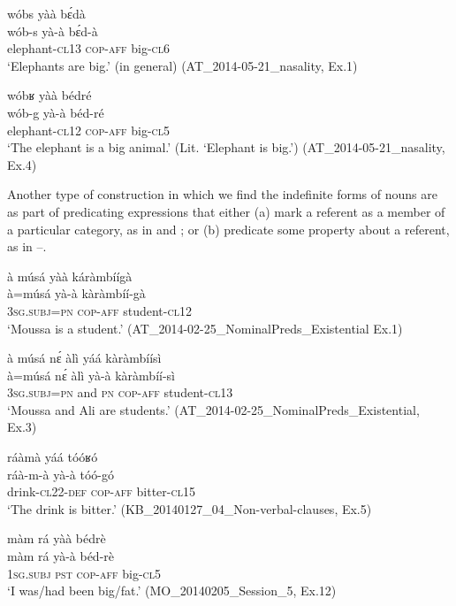 \documentclass[output=paper]{langsci/langscibook}
\begin{document}
\ea\label{ex:teo:32}
\glll wóbs yàà b\'ɛdà\\
 wób-s yà-à b\'ɛd-à\\
 elephant-\textsc{cl13} \textsc{cop-aff} big-\textsc{cl6}\\
\glt ‘Elephants are big.’ (in general) (AT\_2014-05-21\_nasality, Ex.1)
\z

\ea\label{ex:teo:33}
\glll wóbʁ yàà bédré\\
 wób-g yà-à béd-ré\\
elephant-\textsc{cl12} \textsc{cop-aff} big-\textsc{cl5}\\
\glt ‘The elephant is a big animal.’ (Lit. ‘Elephant is big.’) (AT\_2014-05-21\_nasality, Ex.4)
\z

Another type of construction in which we find the indefinite forms of nouns are as part of predicating expressions that either (a) mark a referent as a member of a particular category, as in  and ; or (b) predicate some property about a referent, as in –.

\ea\label{ex:teo:34}
\glll à músá yàà káràmbíígà\\
  à=músá yà-à kàràmbíí-gà\\
 \textsc{3sg.subj=pn} \textsc{cop-aff} student-\textsc{cl12}\\
\glt ‘Moussa is a student.’ (AT\_2014-02-25\_NominalPreds\_Existential Ex.1)
\z

\ea\label{ex:teo:35}
\glll à músá n\'ɛ àlì yáá kàràmbíísì\\
 à=músá n\'ɛ àlì yà-à kàràmbíí-sì\\
\textsc{3sg.subj=pn} and \textsc{pn}  \textsc{cop-aff} student-\textsc{cl}13\\
\glt ‘Moussa and Ali are students.’ (AT\_2014-02-25\_NominalPreds\_Existential, Ex.3)
\z

\ea\label{ex:teo:36}
\glll ráàmà yáá tóóʁó\\
 ráà-m-à yà-à tóó-gó\\
drink-\textsc{cl22-def} \textsc{cop-aff} bitter-\textsc{cl15}\\
\glt ‘The drink is bitter.’ (KB\_20140127\_04\_Non-verbal-clauses, Ex.5)
\z

\ea\label{ex:teo:37}
\glll màm rá yàà bédrè\\
 màm rá yà-à béd-rè\\
\textsc{1sg.subj} \textsc{pst} \textsc{cop-aff} big-\textsc{cl5}\\
\glt ‘I was/had been big/fat.’ (MO\_20140205\_Session\_5, Ex.12)
\z
\end{document}
